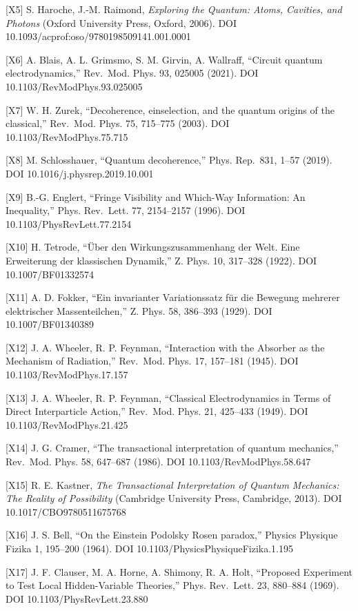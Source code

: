 \documentclass[
  a4paper,
]{article}
\begin{document}
{[}X5{]} S. Haroche, J.-M. Raimond, \emph{Exploring the Quantum: Atoms,
Cavities, and Photons} (Oxford University Press, Oxford, 2006). DOI
10.1093/acprof:oso/9780198509141.001.0001

{[}X6{]} A. Blais, A. L. Grimsmo, S. M. Girvin, A. Wallraff, ``Circuit
quantum electrodynamics,'' Rev.~Mod. Phys. 93, 025005 (2021). DOI
10.1103/RevModPhys.93.025005

{[}X7{]} W. H. Zurek, ``Decoherence, einselection, and the quantum
origins of the classical,'' Rev.~Mod. Phys. 75, 715--775 (2003). DOI
10.1103/RevModPhys.75.715

{[}X8{]} M. Schlosshauer, ``Quantum decoherence,'' Phys. Rep.~831, 1--57
(2019). DOI 10.1016/j.physrep.2019.10.001

{[}X9{]} B.-G. Englert, ``Fringe Visibility and Which-Way Information:
An Inequality,'' Phys. Rev.~Lett. 77, 2154--2157 (1996). DOI
10.1103/PhysRevLett.77.2154

{[}X10{]} H. Tetrode, ``Über den Wirkungszusammenhang der Welt. Eine
Erweiterung der klassischen Dynamik,'' Z. Phys. 10, 317--328 (1922). DOI
10.1007/BF01332574

{[}X11{]} A. D. Fokker, ``Ein invarianter Variationssatz für die
Bewegung mehrerer elektrischer Massenteilchen,'' Z. Phys. 58, 386--393
(1929). DOI 10.1007/BF01340389

{[}X12{]} J. A. Wheeler, R. P. Feynman, ``Interaction with the Absorber
as the Mechanism of Radiation,'' Rev.~Mod. Phys. 17, 157--181 (1945).
DOI 10.1103/RevModPhys.17.157

{[}X13{]} J. A. Wheeler, R. P. Feynman, ``Classical Electrodynamics in
Terms of Direct Interparticle Action,'' Rev.~Mod. Phys. 21, 425--433
(1949). DOI 10.1103/RevModPhys.21.425

{[}X14{]} J. G. Cramer, ``The transactional interpretation of quantum
mechanics,'' Rev.~Mod. Phys. 58, 647--687 (1986). DOI
10.1103/RevModPhys.58.647

{[}X15{]} R. E. Kastner, \emph{The Transactional Interpretation of
Quantum Mechanics: The Reality of Possibility} (Cambridge University
Press, Cambridge, 2013). DOI 10.1017/CBO9780511675768

{[}X16{]} J. S. Bell, ``On the Einstein Podolsky Rosen paradox,''
Physics Physique Fizika 1, 195--200 (1964). DOI
10.1103/PhysicsPhysiqueFizika.1.195

{[}X17{]} J. F. Clauser, M. A. Horne, A. Shimony, R. A. Holt, ``Proposed
Experiment to Test Local Hidden-Variable Theories,'' Phys. Rev.~Lett.
23, 880--884 (1969). DOI 10.1103/PhysRevLett.23.880
\end{document}
